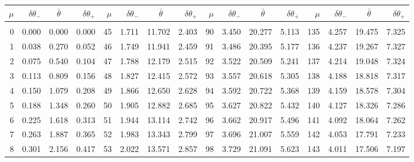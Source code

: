 \newpage
\begin{table}\centering
\small{ \begin{tabular}{rrrr|rrrr|rrrr|rrrr}
$\mu$ & $\delta\theta_-$  & $\bar{\theta}~~~~$ & $\delta\theta_+$ &
$\mu$ & $\delta\theta_-$  & $\bar{\theta}~~~~$ & $\delta\theta_+$ &
$\mu$ & $\delta\theta_-$  & $\bar{\theta}~~~~$ & $\delta\theta_+$ &
$\mu$ & $\delta\theta_-$  & $\bar{\theta}~~~~$ & $\delta\theta_+$ \\\hline
&&&&&&&&&&&&&&&\\[-1.75ex]
  0 & \tiny{  0.000} &   0.000 & \tiny{  0.000} &  45 & \tiny{  1.711} &  11.702 & \tiny{  2.403} &  90 & \tiny{  3.450} &  20.277 & \tiny{  5.113} & 135 & \tiny{  4.257} &  19.475 & \tiny{  7.325}\\
  1 & \tiny{  0.038} &   0.270 & \tiny{  0.052} &  46 & \tiny{  1.749} &  11.941 & \tiny{  2.459} &  91 & \tiny{  3.486} &  20.395 & \tiny{  5.177} & 136 & \tiny{  4.237} &  19.267 & \tiny{  7.327}\\
  2 & \tiny{  0.075} &   0.540 & \tiny{  0.104} &  47 & \tiny{  1.788} &  12.179 & \tiny{  2.515} &  92 & \tiny{  3.522} &  20.509 & \tiny{  5.241} & 137 & \tiny{  4.214} &  19.048 & \tiny{  7.324}\\
  3 & \tiny{  0.113} &   0.809 & \tiny{  0.156} &  48 & \tiny{  1.827} &  12.415 & \tiny{  2.572} &  93 & \tiny{  3.557} &  20.618 & \tiny{  5.305} & 138 & \tiny{  4.188} &  18.818 & \tiny{  7.317}\\
  4 & \tiny{  0.150} &   1.079 & \tiny{  0.208} &  49 & \tiny{  1.866} &  12.650 & \tiny{  2.628} &  94 & \tiny{  3.592} &  20.722 & \tiny{  5.368} & 139 & \tiny{  4.159} &  18.578 & \tiny{  7.304}\\
  5 & \tiny{  0.188} &   1.348 & \tiny{  0.260} &  50 & \tiny{  1.905} &  12.882 & \tiny{  2.685} &  95 & \tiny{  3.627} &  20.822 & \tiny{  5.432} & 140 & \tiny{  4.127} &  18.326 & \tiny{  7.286}\\
  6 & \tiny{  0.225} &   1.618 & \tiny{  0.313} &  51 & \tiny{  1.944} &  13.114 & \tiny{  2.742} &  96 & \tiny{  3.662} &  20.917 & \tiny{  5.496} & 141 & \tiny{  4.092} &  18.064 & \tiny{  7.262}\\
  7 & \tiny{  0.263} &   1.887 & \tiny{  0.365} &  52 & \tiny{  1.983} &  13.343 & \tiny{  2.799} &  97 & \tiny{  3.696} &  21.007 & \tiny{  5.559} & 142 & \tiny{  4.053} &  17.791 & \tiny{  7.233}\\
  8 & \tiny{  0.301} &   2.156 & \tiny{  0.417} &  53 & \tiny{  2.022} &  13.571 & \tiny{  2.857} &  98 & \tiny{  3.729} &  21.091 & \tiny{  5.623} & 143 & \tiny{  4.011} &  17.506 & \tiny{  7.197}\\

\end{tabular}}
\end{table}
